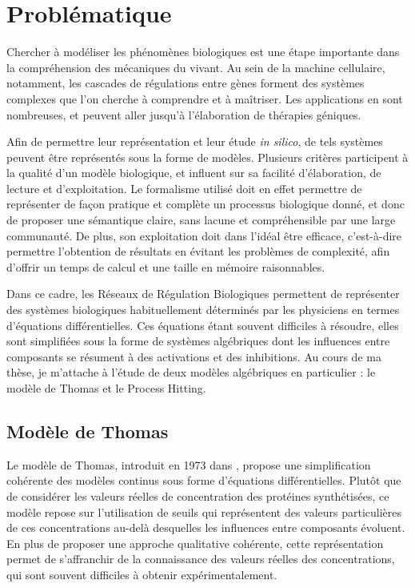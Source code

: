
\chapter{Problématique}

Chercher à modéliser les phénomènes biologiques est une étape importante dans la compréhension des mécaniques du vivant.
Au sein de la machine cellulaire, notamment, les cascades de régulations entre gènes forment des systèmes complexes que l'on cherche à comprendre et à maîtriser.
Les applications en sont nombreuses, et peuvent aller jusqu'à l'élaboration de thérapies géniques.

Afin de permettre leur représentation et leur étude \textit{in silico}, de tels systèmes peuvent être représentés sous la forme de modèles.
Plusieurs critères participent à la qualité d'un modèle biologique, et influent sur sa facilité d'élaboration, de lecture et d'exploitation.
Le formalisme utilisé doit en effet permettre de représenter de façon pratique et complète un processus biologique donné, et donc
de proposer une sémantique claire, sans lacune et compréhensible par une large communauté.
De plus, son exploitation doit dans l'idéal être efficace, c'est-à-dire permettre l'obtention de résultats en évitant les problèmes de complexité, afin d'offrir un temps de calcul et une taille en mémoire raisonnables.

Dans ce cadre, les Réseaux de Régulation Biologiques permettent de représenter des systèmes biologiques habituellement déterminés par les physiciens en termes d'équations différentielles.
Ces équations étant souvent difficiles à résoudre, elles sont simplifiées sous la forme de systèmes algébriques dont les influences entre composants se résument à des activations et des inhibitions.
Au cours de ma thèse, je m'attache à l'étude de deux modèles algébriques en particulier : le modèle de Thomas et le Process Hitting.

\section{Modèle de Thomas}
Le modèle de Thomas, introduit en 1973 dans \cite{Thomas73}, propose une simplification cohérente des modèles continus sous forme d'équations différentielles.
Plutôt que de considérer les valeurs réelles de concentration des protéines synthétisées, ce modèle repose sur l'utilisation de seuils qui représentent des valeurs particulières de ces concentrations au-delà desquelles les influences entre composants évoluent.
En plus de proposer une approche qualitative cohérente, cette représentation permet de s'affranchir de la connaissance des valeurs réelles des concentrations, qui sont souvent difficiles à obtenir expérimentalement.

